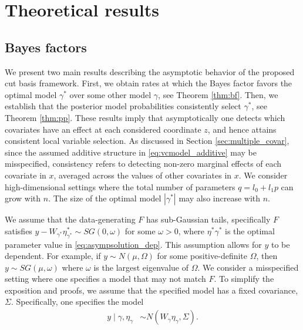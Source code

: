 \section{Theoretical results}
\label{sec:theory}


\subsection{Bayes factors}
\label{ssec:bf}

We present two main results describing the asymptotic behavior of the proposed cut basis framework. First, we obtain rates at which the Bayes factor favors the optimal model $\gamma^*$ over some other model $\gamma$, see Theorem \ref{thm:bf}. Then, we establish that the  posterior model probabilities consistently select $\gamma^*$, see Theorem \ref{thm:pp}.  
These results imply that asymptotically one detects which covariates have an effect at each considered coordinate $z$, and hence attains consistent local variable selection. As discussed in Section \ref{sec:multiple_covar}, since the assumed additive structure in \eqref{eq:vcmodel_additive} may be misspecified, consistency refers to detecting non-zero marginal effects of each covariate in $x$, averaged across the values of other covariates in $x$.
We consider high-dimensional settings where the total number of parameters $q = l_0 + l_1p$ can grow with $n$.
The size of the optimal model $|\gamma^*|$ may also increase with $n$. %

We assume that the data-generating $F$ has sub-Gaussian tails, specifically  $F$ satisfies
$ y - W_{\gamma^*} \eta_{\gamma^*}^* \sim SG(0, \omega)$
for some $\omega > 0$, where $\eta^*{\gamma^*}$ is the optimal parameter value in \eqref{eq:asympsolution_dep}.
This assumption allows for $y$ to be dependent.  For example, if $y \sim N(\mu, \Omega)$ for some positive-definite $\Omega$, then $y \sim SG(\mu,\omega)$ where $\omega$ is the largest eigenvalue of $\Omega$.
We consider a misspecified setting where one specifies  a model that may not match $F$. 
To simplify the exposition and proofs,  we assume that the specified model has a fixed covariance, $\Sigma$.
Specifically, one specifies the model
\begin{align}
 y \mid \gamma, \eta_\gamma &\sim N(W_\gamma \eta_\gamma, \Sigma).
\nonumber
\end{align}


